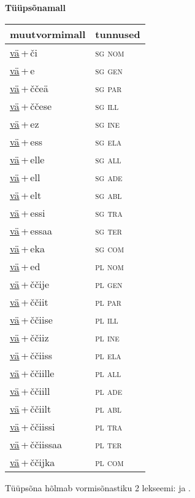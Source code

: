 
\vspace{1.8em}
\begin{minipage}{\textwidth}
\textbf{Tüüpsõnamall \,}\\

\begin{sideways}
\begin{tabular}{l l}
muutvormimall & tunnused \\
\hline
\underline{vä}\,+\,či & \textsc{ sg nom } \\
\underline{vä}\,+\,e & \textsc{ sg gen } \\
\underline{vä}\,+\,ččeä & \textsc{ sg par } \\
\underline{vä}\,+\,ččese & \textsc{ sg ill } \\
\underline{vä}\,+\,ez & \textsc{ sg ine } \\
\underline{vä}\,+\,ess & \textsc{ sg ela } \\
\underline{vä}\,+\,elle & \textsc{ sg all } \\
\underline{vä}\,+\,ell & \textsc{ sg ade } \\
\underline{vä}\,+\,elt & \textsc{ sg abl } \\
\underline{vä}\,+\,essi & \textsc{ sg tra } \\
\underline{vä}\,+\,essaa & \textsc{ sg ter } \\
\underline{vä}\,+\,eka & \textsc{ sg com } \\
\underline{vä}\,+\,ed & \textsc{ pl nom } \\
\underline{vä}\,+\,ččije & \textsc{ pl gen } \\
\underline{vä}\,+\,ččiit & \textsc{ pl par } \\
\underline{vä}\,+\,ččiise & \textsc{ pl ill } \\
\underline{vä}\,+\,ččiiz & \textsc{ pl ine } \\
\underline{vä}\,+\,ččiiss & \textsc{ pl ela } \\
\underline{vä}\,+\,ččiille & \textsc{ pl all } \\
\underline{vä}\,+\,ččiill & \textsc{ pl ade } \\
\underline{vä}\,+\,ččiilt & \textsc{ pl abl } \\
\underline{vä}\,+\,ččiissi & \textsc{ pl tra } \\
\underline{vä}\,+\,ččiissaa & \textsc{ pl ter } \\
\underline{vä}\,+\,ččijka & \textsc{ pl com } \\
\end{tabular}
\end{sideways}
\label{tab:tüüpsõnamall-väči}

\end{minipage}

 
\vspace{1em}
\noindent Tüüpsõna hõlmab vormisõnastiku 2 lekseemi:  ja .
